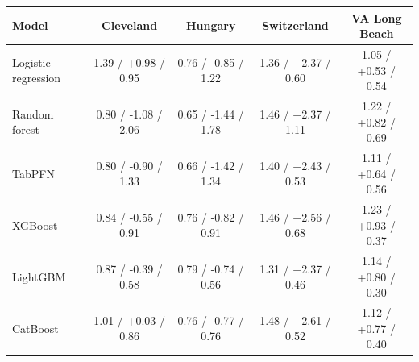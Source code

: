 \begin{tabular}{lcccc}
\toprule
Model & Cleveland & Hungary & Switzerland & VA Long Beach \\
\midrule
Logistic regression & 1.39 / +0.98 / 0.95 & 0.76 / -0.85 / 1.22 & 1.36 / +2.37 / 0.60 & 1.05 / +0.53 / 0.54 \\
Random forest & 0.80 / -1.08 / 2.06 & 0.65 / -1.44 / 1.78 & 1.46 / +2.37 / 1.11 & 1.22 / +0.82 / 0.69 \\
TabPFN & 0.80 / -0.90 / 1.33 & 0.66 / -1.42 / 1.34 & 1.40 / +2.43 / 0.53 & 1.11 / +0.64 / 0.56 \\
XGBoost & 0.84 / -0.55 / 0.91 & 0.76 / -0.82 / 0.91 & 1.46 / +2.56 / 0.68 & 1.23 / +0.93 / 0.37 \\
LightGBM & 0.87 / -0.39 / 0.58 & 0.79 / -0.74 / 0.56 & 1.31 / +2.37 / 0.46 & 1.14 / +0.80 / 0.30 \\
CatBoost & 1.01 / +0.03 / 0.86 & 0.76 / -0.77 / 0.76 & 1.48 / +2.61 / 0.52 & 1.12 / +0.77 / 0.40 \\
\bottomrule
\end{tabular}
